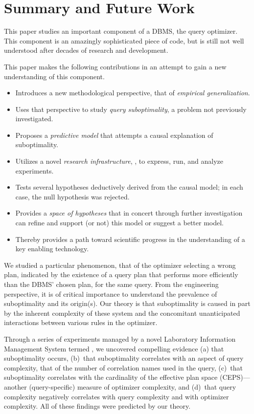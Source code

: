 \section{Summary and Future Work}\label{sec:future}
{
This paper studies an important
component of a DBMS, the query optimizer. This component is an amazingly
sophisticated piece of code, but is still not well understood after decades
of research and development.

This paper makes the following contributions in
an attempt to gain a new understanding of this component.
\begin{itemize}
\item Introduces a new methodological
perspective, that of {\em empirical generalization}.
\item Uses that perspective to study {\em query suboptimality}, a problem
  not previously investigated.
\item Proposes a {\em predictive model} that attempts a causal explanation of
  suboptimality. 
\item Utilizes a novel {\em research infrastructure}, \azdb, to express, run, and
  analyze experiments.
\item Tests several hypotheses deductively derived from the causal model; in
  each case, the null hypothesis was rejected.
\item Provides a {\em space of hypotheses} that in concert through further
  investigation can refine and support (or not) this model or suggest a
  better model.
\item Thereby provides a path toward scientific progress in the
  understanding of a key enabling technology.
\end{itemize}

We studied a particular
phenomenon, that of the optimizer selecting a wrong plan, indicated by the existence of a query plan that performs more efficiently
than the DBMS' chosen plan, for the same query. From the engineering
perspective, it is of critical importance to understand the prevalence
of suboptimality and its origin(s). Our theory is that suboptimality
is caused in part by the inherent complexity of these system and the
concomitant unanticipated interactions between various rules in the
optimizer.

Through a series of experiments managed by a novel Laboratory
Information Management System termed \azdb, we uncovered compelling evidence 
(a) that suboptimality occurs, (b)~that  suboptimality
correlates with an aspect of query complexity, that of the number of
correlation names used in the query, (c)~that suboptimality correlates
with the cardinality of the effective plan space 
(CEPS)---another (query-specific) measure of optimizer complexity, and (d)~that
query complexity negatively correlates with query complexity and with optimizer
complexity. All of these findings were predicted by our theory.

}
